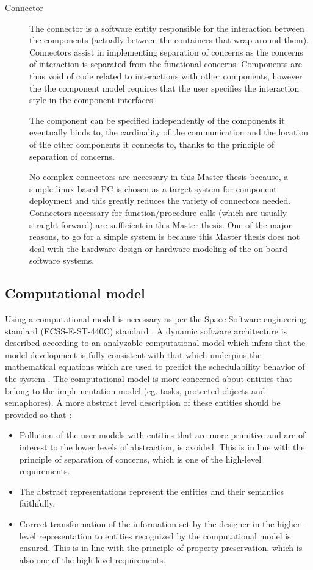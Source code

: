 \begin{description}
\item [Connector] The connector is a software entity responsible for the interaction between the components (actually between the containers that wrap around them). Connectors assist in implementing separation of concerns as the concerns of interaction is separated from the functional concerns. Components are thus void of code related to interactions with other components, however the the component model requires that the user specifies the interaction style in the component interfaces.

The component can be specified independently of the components it eventually binds to, the cardinality of the communication and the location of the other components it connects to, thanks to the principle of separation of concerns. 

No complex connectors are necessary in this Master thesis because, a simple linux based PC is chosen as a target system for component deployment and this greatly reduces the variety of connectors needed. Connectors necessary for function/procedure calls (which are usually straight-forward) are sufficient in this Master thesis. One of the major reasons, to go for a simple system is because this Master thesis does not deal with the hardware design or hardware modeling of the on-board software systems.           
\end{description} 

\subsection{Computational model}
\label{section: Computational model} 
Using a computational model is necessary as per the Space Software engineering standard (ECSS-E-ST-440C) standard \cite{SAVOIR}. A dynamic software architecture is described according to an analyzable computational model which infers that the model development is fully consistent with that which underpins the mathematical equations which are used to predict the schedulability behavior of the system \cite{ScheduAnaly}. The computational model is more concerned about entities that belong to the implementation model (eg. tasks, protected objects and semaphores). A more abstract level description of these entities should be provided so that \cite{SAVOIR}:

\begin{itemize}
\item Pollution of the user-models with entities that are more primitive and are of interest to the lower levels of abstraction, is avoided. This is in line with the principle of separation of concerns, which is one of the high-level requirements.

\item The abstract representations represent the entities and their semantics faithfully.

\item Correct transformation of the information set by the designer in the higher-level representation to entities recognized by the computational model is ensured. This is in line with the principle of property preservation, which is also one of the high level requirements. 
\end{itemize} 

